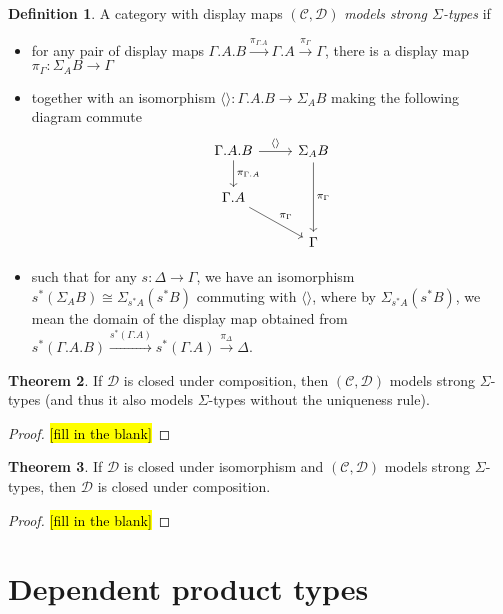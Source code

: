 \documentclass{article}
\theoremstyle{definition}
\newtheorem{definition}{Definition}[section]
\newtheorem{theorem}[definition]{Theorem}
\newcommand{\C}{\mathcal C}
\newcommand{\D}{\mathcal D}
\begin{document}
\begin{definition}
    A category with display maps $(\C, \D)$ \emph{models strong $\Sigma$-types} if 
    \begin{itemize}
        \item for any pair of display maps $\Gamma.A . B \xrightarrow{\pi_{\Gamma.A}} \Gamma. A  \xrightarrow{\pi_{\Gamma}} \Gamma$, there is a display map $\pi_\Gamma : \Sigma_A B \to \Gamma$
        \item together with an isomorphism $\langle \rangle : \Gamma. A . B \to \Sigma_A B$ making the following diagram commute
        \[
            \begin{tikzcd}
                \Gamma . A . B \ar[d, "\pi_{\Gamma.A}"] \ar[r,"\langle \rangle"] & \Sigma_A B \ar[dd,"\pi_\Gamma"] \\
                \Gamma . A \ar[dr, "\pi_{\Gamma}"] \\
                & \Gamma
            \end{tikzcd}
       \] 
       \item such that for any $s : \Delta \to \Gamma$, we have an isomorphism $ s^* (\Sigma_A B ) \cong \Sigma_{s^* A} (s ^* B)$ commuting with $\langle \rangle$, where by $\Sigma_{s^* A} (s ^* B)$, we mean the domain of the display map obtained from $s^* (\Gamma.A . B) \xrightarrow{s^* (\Gamma. A)} s^* (\Gamma. A)  \xrightarrow{\pi_{\Delta}} \Delta$.
    \end{itemize}
\end{definition}

\begin{theorem}
    If $\D$ is closed under composition, then $(\C, \D)$ models strong $\Sigma$-types (and thus it also models $\Sigma$-types without the uniqueness rule).
\end{theorem}
\begin{proof}
    \hl{[fill in the blank]}
\end{proof}

\begin{theorem}
    If $\D$ is closed under isomorphism and $(\C, \D)$ models strong $\Sigma$-types, then $\D$ is closed under composition.
\end{theorem}
\begin{proof}
    \hl{[fill in the blank]}
\end{proof}

\section{Dependent product types}
\end{document}
